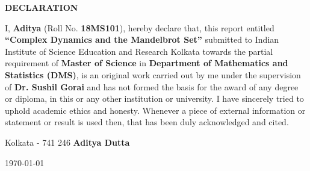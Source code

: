 \setcounter{page}{2}
\begin{center}
	{\Large{\textbf{DECLARATION}}}
\end{center}

\noindent

I, \textbf{Aditya} (Roll No. \textbf{18MS101}), hereby declare that, this report entitled \textbf{``Complex Dynamics and the Mandelbrot Set”} submitted to Indian Institute of Science Education and Research Kolkata towards the partial requirement of \textbf{Master of Science} in \textbf{Department of Mathematics and Statistics (DMS)}, is an original work carried out by me under the supervision of \textbf{Dr. Sushil Gorai} and has not formed the basis for the award of any degree or diploma, in this or any other institution or university. I have sincerely tried to uphold academic ethics and honesty. Whenever a piece of external information or statement or result is used then, that has been duly acknowledged and cited.

\vspace{4cm} %

\noindent Kolkata - 741 246 \hfill \textbf{Aditya Dutta}

\noindent \today \hfill

\clearpage
